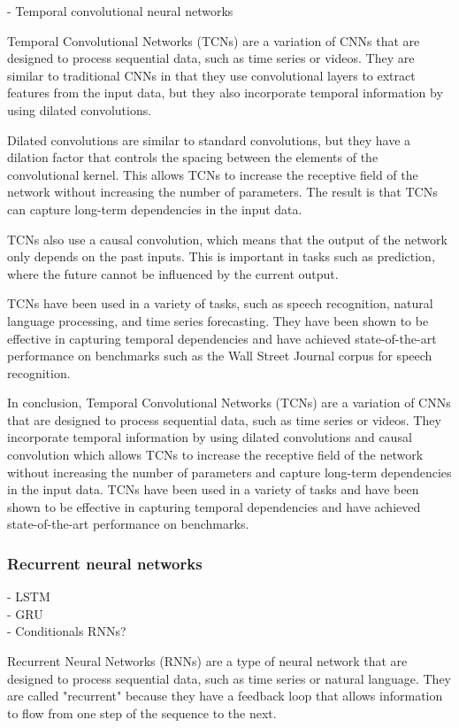 - Temporal convolutional neural networks

Temporal Convolutional Networks (TCNs) are a variation of CNNs that are designed to process sequential data, such as time series or videos. They are similar to traditional CNNs in that they use convolutional layers to extract features from the input data, but they also incorporate temporal information by using dilated convolutions.

Dilated convolutions are similar to standard convolutions, but they have a dilation factor that controls the spacing between the elements of the convolutional kernel. This allows TCNs to increase the receptive field of the network without increasing the number of parameters. The result is that TCNs can capture long-term dependencies in the input data.

TCNs also use a causal convolution, which means that the output of the network only depends on the past inputs. This is important in tasks such as prediction, where the future cannot be influenced by the current output.

TCNs have been used in a variety of tasks, such as speech recognition, natural language processing, and time series forecasting. They have been shown to be effective in capturing temporal dependencies and have achieved state-of-the-art performance on benchmarks such as the Wall Street Journal corpus for speech recognition.

In conclusion, Temporal Convolutional Networks (TCNs) are a variation of CNNs that are designed to process sequential data, such as time series or videos. They incorporate temporal information by using dilated convolutions and causal convolution which allows TCNs to increase the receptive field of the network without increasing the number of parameters and capture long-term dependencies in the input data. TCNs have been used in a variety of tasks and have been shown to be effective in capturing temporal dependencies and have achieved state-of-the-art performance on benchmarks.


\subsubsection{Recurrent neural networks}
- LSTM\\
- GRU\\
- Conditionals RNNs?

Recurrent Neural Networks (RNNs) are a type of neural network that are designed to process sequential data, such as time series or natural language. They are called "recurrent" because they have a feedback loop that allows information to flow from one step of the sequence to the next.

